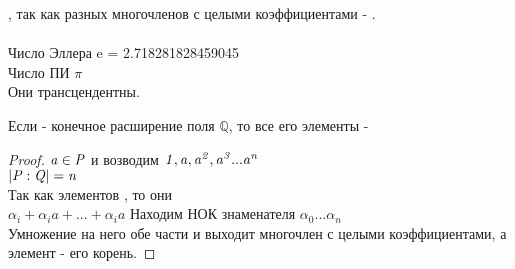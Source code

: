 , так как разных многочленов с целыми
коэффициентами - . \\
 \\
Число Эллера {\bk e} = 2.718281828459045 \\
Число ПИ $\pi $ \\
Они трансцендентны.\\

\begin{theorem}
  Если  - конечное расширение поля $\mathbb {Q}$, то все его элементы -
\end{theorem}

\begin{proof}
  $\mathit {a \in P}$ и возводим $\mathit {1, a, a^2, a^3...a^n}$ \\
  $\mathit {|P:Q| = n}$ \\
  Так как элементов , то они  \\
  $\alpha_{i} + \alpha_{i}a + ... + \alpha_{i}a$ %
  Находим НОК знаменателя $\alpha_{0} ... \alpha_{n}$ \\
  Умножение на него обе части и выходит многочлен с целыми коэффициентами, а
  элемент  - его корень.
\end{proof}